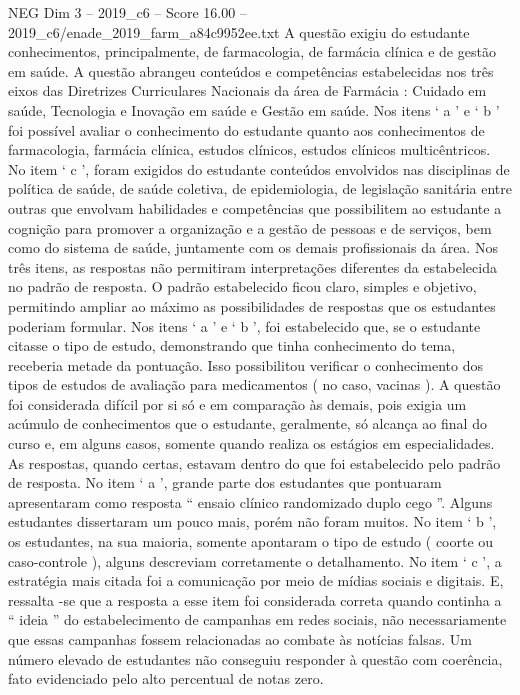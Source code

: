 \begin{textsample}{NEG Dim 3 – 2019\_c6 – Score 16.00 – 2019\_c6/enade\_2019\_farm\_a84c9952ee.txt}
A questão exigiu do estudante conhecimentos, principalmente, de farmacologia, de farmácia clínica e de gestão em saúde.
A questão abrangeu conteúdos e competências estabelecidas nos três eixos das Diretrizes Curriculares Nacionais da área de Farmácia : Cuidado em saúde, Tecnologia e Inovação em saúde e Gestão em saúde.
Nos itens ‘ a ’ e ‘ b ’ foi possível avaliar o conhecimento do estudante quanto aos conhecimentos de farmacologia, farmácia clínica, estudos clínicos, estudos clínicos multicêntricos.
No item ‘ c ’, foram exigidos do estudante conteúdos envolvidos nas disciplinas de política de saúde, de saúde coletiva, de epidemiologia, de legislação sanitária entre outras que envolvam habilidades e competências que possibilitem ao estudante a cognição para promover a organização e a gestão de pessoas e de serviços, bem como do sistema de saúde, juntamente com os demais profissionais da área.
Nos três itens, as respostas não permitiram interpretações diferentes da estabelecida no padrão de resposta.
O padrão estabelecido ficou claro, simples e objetivo, permitindo ampliar ao máximo as possibilidades de respostas que os estudantes poderiam formular.
Nos itens ‘ a ’ e ‘ b ’, foi estabelecido que, se o estudante citasse o tipo de estudo, demonstrando que tinha conhecimento do tema, receberia metade da pontuação.
Isso possibilitou verificar o conhecimento dos tipos de estudos de avaliação para medicamentos ( no caso, vacinas ).
A questão foi considerada difícil por si só e em comparação às demais, pois exigia um acúmulo de conhecimentos que o estudante, geralmente, só alcança ao final do curso e, em alguns casos, somente quando realiza os estágios em especialidades.
As respostas, quando certas, estavam dentro do que foi estabelecido pelo padrão de resposta.
No item ‘ a ’, grande parte dos estudantes que pontuaram apresentaram como resposta “ ensaio clínico randomizado duplo cego ”.
Alguns estudantes dissertaram um pouco mais, porém não foram muitos.
No item ‘ b ’, os estudantes, na sua maioria, somente apontaram o tipo de estudo ( coorte ou caso-controle ), alguns descreviam corretamente o detalhamento.
No item ‘ c ’, a estratégia mais citada foi a comunicação por meio de mídias sociais e digitais.
E, ressalta -se que a resposta a esse item foi considerada correta quando continha a “ ideia ” do estabelecimento de campanhas em redes sociais, não necessariamente que essas campanhas fossem relacionadas ao combate às notícias falsas.
Um número elevado de estudantes não conseguiu responder à questão com coerência, fato evidenciado pelo alto percentual de notas zero.

\end{textsample}
